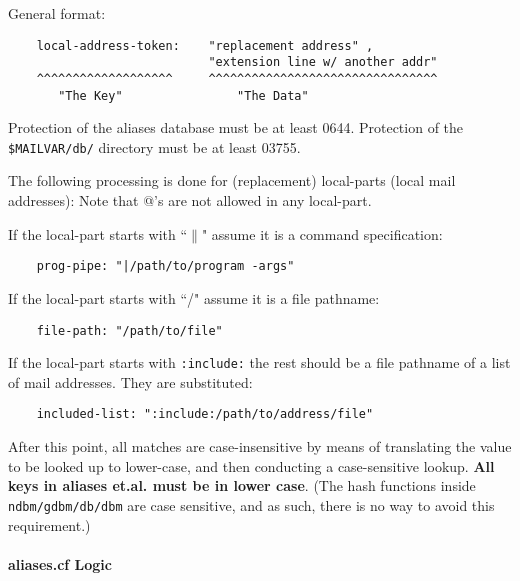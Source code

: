 General format:

\begin{verbatim}
    local-address-token:    "replacement address" ,
                            "extension line w/ another addr"
    ^^^^^^^^^^^^^^^^^^^     ^^^^^^^^^^^^^^^^^^^^^^^^^^^^^^^^
       "The Key"                "The Data"
\end{verbatim}

Protection of the aliases database must be at least 0644.
Protection of the {\tt \$MAILVAR/db/} directory must be at least 03755.



The following processing is done for (replacement) local-parts
(local mail addresses):  Note that @'s are not allowed in any local-part.



If the local-part starts with ``{\tt $\|$}" assume it is a command specification:
\begin{verbatim}
    prog-pipe: "|/path/to/program -args"
\end{verbatim}

If the local-part starts with ``/" assume it is a file pathname:
\begin{verbatim}
    file-path: "/path/to/file"
\end{verbatim}

If the local-part starts with {\tt :include:} the rest should be a file
pathname of a list of mail addresses.  They are substituted:
\begin{verbatim}
    included-list: ":include:/path/to/address/file"
\end{verbatim}

After this point, all matches are case-insensitive by means of translating
the value to be looked up to lower-case, and then conducting a case-sensitive
lookup. {\bf All keys in aliases et.al. must be in lower case}.
(The hash functions inside  {\tt ndbm/gdbm/db/dbm}  are case sensitive, and 
as such, there is no way to avoid this requirement.)


\paragraph{aliases.cf Logic}

